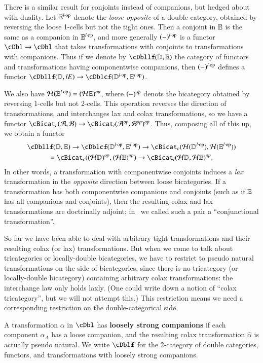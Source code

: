 \begin{rmk}
  There is a similar result for conjoints instead of companions, but hedged about with duality.
  Let $\mathbb{E}^{l\cdot\mathrm{op}}$ denote the \emph{loose opposite} of a double category, obtained by reversing the loose 1-cells but not the tight ones.
  Then a conjoint in $\mathbb{E}$ is the same as a companion in $\mathbb{E}^{l\cdot\mathrm{op}}$, and more generally $(-)^{l\cdot\mathrm{op}}$ is a functor $\cDbl \to \cDbl$ that takes transformations with conjoints to transformations with companions.
  Thus if we denote by $\cDbllf(\lD,\lE)$ the category of functors and transformations having componentwise companions, then $(-)^{l\cdot\mathrm{op}}$ defines a functor $\cDbllf(\lD,lE) \to \cDblcf(\lD\lop,\lE\lop)$.

  We also have $\mathcal{H}(\mathbb{E}^{l\cdot\mathrm{op}}) = (\mathcal{H}\mathbb{E})^{\mathit{op}}$, where $(-)^{\mathit{op}}$ denots the bicategory obtained by reversing 1-cells but not 2-cells.
  This operation reverses the direction of transformations, and interchanges lax and colax transformations, so we have a functor $\cBicat_c(\cA,\cB) \to \cBicat_l(\cA\op,\cB\op)\op$.
  Thus, composing all of this up, we obtain a functor
  \begin{multline*}
    \cDbllf(\lD,\lE) \to \cDblcf(\lD\lop,\lE\lop) \to \cBicat_c(\cH(\lD\lop),\cH(\lE\lop))\\ = \cBicat_c((\cH\lD)\op, (\cH\lE)\op) \to \cBicat_l(\cH\lD, \cH\lE)\op.
  \end{multline*}
  In other words, a transformation with componentwise conjoints induces a \emph{lax} transformation in the \emph{opposite} direction between loose bicategories.
  If a transformation has both componentwise companions and conjoints (such as if $\mathbb{E}$ has all companions and conjoints), then the resulting colax and lax transformations are doctrinally adjoint; in~\cite{shulman:smbicat} we called such a pair a ``conjunctional transformation''.
\end{rmk}

So far we have been able to deal with arbitrary tight transformations and their resulting colax (or lax) transformations.
But when we come to talk about tricategories or locally-double bicategories, we have to restrict to pseudo natural transformations on the side of bicategories, since there is no tricategory (or locally-double bicategory) containing arbitrary colax transformations: the interchange law only holds laxly.
(One could write down a notion of ``colax tricategory'', but we will not attempt this.)
This restriction means we need a corresponding restriction on the double-categorical side.


\begin{defn}
  A transformation $\alpha$ in $\cDbl$ has \textbf{loosely strong companions} if each component $\alpha_A$ has a loose companion, and the resulting colax transformation $\hat\alpha$ is actually pseudo natural.
  We write $\cDblf$ for the 2-category of double categories, functors, and transformations with loosely strong companions.
\end{defn}

